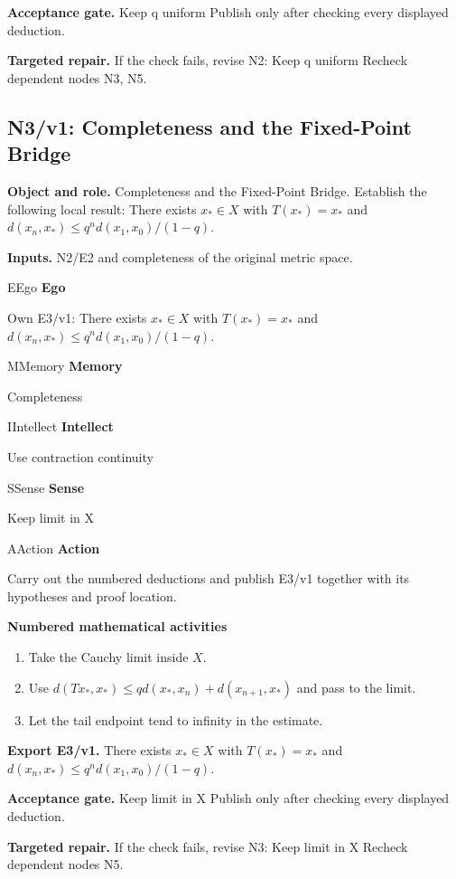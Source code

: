 \documentclass[preprint,12pt,aps,pra,showkeys,amsmath,amssymb,superscriptaddress,floatfix]{revtex4-2}
\theoremstyle{definition}
\theoremstyle{remark}
\newcommand{\mmfaculty}[3]{%
 \begin{mmfacultybox}{#1}{#2}
 {\sffamily\bfseries\color{MMBlue}#2}\par\smallskip #3
 \end{mmfacultybox}}
\newcommand{\field}[2]{\par\smallskip\noindent\textbf{#1.} #2\par}
\begin{document}
\field{Acceptance gate}{Keep q uniform Publish only after checking every displayed deduction.}

\field{Targeted repair}{If the check fails, revise N2: Keep q uniform Recheck dependent nodes
N3, N5.}

\clearpage

\subsection{N3/v1: Completeness and the Fixed-Point Bridge}

\field{Object and role}{Completeness and the Fixed-Point Bridge. Establish the following local
result: There exists \(x_*\in X\) with \(T(x_*)=x_*\) and
\(d(x_n,x_*)\le q^n d(x_1,x_0)/(1-q)\).}

\field{Inputs}{N2/E2 and completeness of the original metric space.}

\mmfaculty{E}{Ego}{Own E3/v1: There exists \(x_*\in X\) with \(T(x_*)=x_*\) and
\(d(x_n,x_*)\le q^n d(x_1,x_0)/(1-q)\).}

\mmfaculty{M}{Memory}{Completeness}

\mmfaculty{I}{Intellect}{Use contraction continuity}

\mmfaculty{S}{Sense}{Keep limit in X}

\mmfaculty{A}{Action}{Carry out the numbered deductions and publish E3/v1 together with its
hypotheses and proof location.}

\smallskip\noindent\textbf{Numbered mathematical activities}

\begin{enumerate}[label=N3.\arabic*,leftmargin=3.4em]

\item Take the Cauchy limit inside \(X\).

\item Use \(d(Tx_*,x_*)\le qd(x_*,x_n)+d(x_{n+1},x_*)\) and pass to the limit.

\item Let the tail endpoint tend to infinity in the estimate.

\end{enumerate}

\field{Export E3/v1}{There exists \(x_*\in X\) with \(T(x_*)=x_*\) and
\(d(x_n,x_*)\le q^n d(x_1,x_0)/(1-q)\).}

\field{Acceptance gate}{Keep limit in X Publish only after checking every displayed deduction.}

\field{Targeted repair}{If the check fails, revise N3: Keep limit in X Recheck dependent nodes
N5.}
\end{document}
